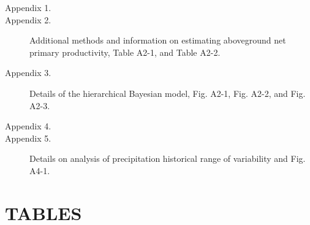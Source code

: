 \documentclass[fleqn,10pt,lineno]{wlpeerj} %
\begin{document}
\begin{description}
\item [Appendix 1.] 
\item [Appendix 2.] Additional methods and information on estimating aboveground net primary productivity, Table A2-1, and Table A2-2.
\item [Appendix 3.] Details of the hierarchical Bayesian model, Fig. A2-1, Fig. A2-2, and Fig. A2-3.
\item [Appendix 4.] 
\item [Appendix 5.] Details on analysis of precipitation historical range of variability and Fig. A4-1.
\end{description}

\newpage{}

\hypertarget{tables}{%
\section{TABLES}\label{tables}}
\end{document}
